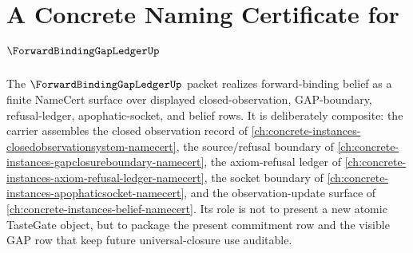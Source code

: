 \chapter{A Concrete Naming Certificate for $\ForwardBindingGapLedgerUp$}
\label{ch:concrete-instances-forward-binding-gap-ledger-namecert}

The $\ForwardBindingGapLedgerUp$ packet realizes forward-binding belief as a finite NameCert surface over displayed closed-observation, GAP-boundary, refusal-ledger, apophatic-socket, and belief rows. It is deliberately composite: the carrier assembles the closed observation record of \autoref{ch:concrete-instances-closedobservationsystem-namecert}, the source/refusal boundary of \autoref{ch:concrete-instances-gapclosureboundary-namecert}, the axiom-refusal ledger of \autoref{ch:concrete-instances-axiom-refusal-ledger-namecert}, the socket boundary of \autoref{ch:concrete-instances-apophaticsocket-namecert}, and the observation-update surface of \autoref{ch:concrete-instances-belief-namecert}. Its role is not to present a new atomic TasteGate object, but to package the present commitment row and the visible GAP row that keep future universal-closure use auditable.

